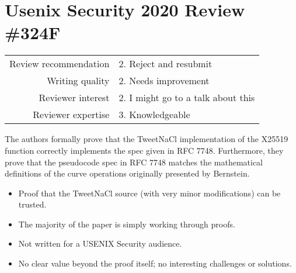 \newpage
\section{Usenix Security 2020 Review \#324F}

\begin{tabular}{rl}
    \toprule
    Review recommendation & 2. Reject and resubmit             \\
    Writing quality       & 2. Needs improvement               \\
    Reviewer interest     & 2. I might go to a talk about this \\
    Reviewer expertise    & 3. Knowledgeable                   \\
    \bottomrule
\end{tabular}

\begin{center}
\end{center}

The authors formally prove that the TweetNaCl implementation of the X25519
function correctly implements the spec given in RFC 7748. Furthermore, they
prove that the pseudocode spec in RFC 7748 matches the mathematical definitions
of the curve operations originally presented by Bernstein.

\begin{center}
\end{center}
\begin{itemize}
    \item Proof that the TweetNaCl source (with very minor modifications) can be trusted.
\end{itemize}

\begin{center}
\end{center}

\begin{itemize}
    \item The majority of the paper is simply working through proofs.
    \item Not written for a USENIX Security audience.
    \item No clear value beyond the proof itself; no interesting challenges or solutions.
\end{itemize}

\begin{center}
\end{center}

